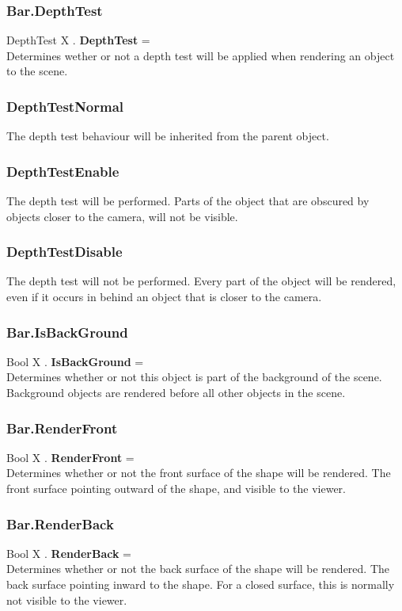 \subsubsection{Bar.DepthTest \label{F:Bar:DepthTest}}
DepthTest X . \textbf{DepthTest} = \\
Determines wether or not a depth test will be applied when rendering an object to the scene.

\subsubsection{DepthTestNormal \label{T:DepthTest|DepthTestNormal}}
The depth test behaviour will be inherited from the parent object.

\subsubsection{DepthTestEnable \label{T:DepthTest|DepthTestEnable}}
The depth test will be performed. Parts of the object that are obscured by objects closer to the camera, will not be visible.

\subsubsection{DepthTestDisable \label{T:DepthTest|DepthTestDisable}}
The depth test will not be performed. Every part of the object will be rendered, even if it occurs in behind an object that is closer to the camera.

\subsubsection{Bar.IsBackGround \label{F:Bar:IsBackGround}}
Bool X . \textbf{IsBackGround} = \\
Determines whether or not this object is part of the background of the scene. Background objects are rendered before all other objects in the scene.

\subsubsection{Bar.RenderFront \label{F:Bar:RenderFront}}
Bool X . \textbf{RenderFront} = \\
Determines whether or not the front surface of the shape will be rendered. The front surface pointing outward of the shape, and visible to the viewer.

\subsubsection{Bar.RenderBack \label{F:Bar:RenderBack}}
Bool X . \textbf{RenderBack} = \\
Determines whether or not the back surface of the shape will be rendered. The back surface pointing inward to the shape. For a closed surface, this is normally not visible to the viewer.

